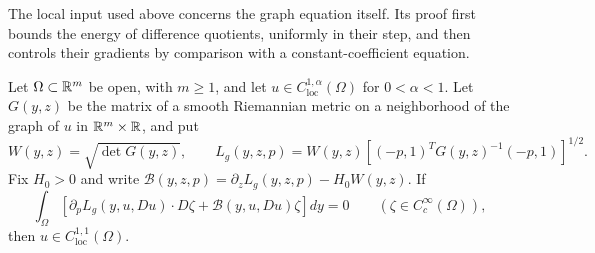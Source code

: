 The local input used above concerns the graph equation itself. Its
proof first bounds the energy of difference quotients, uniformly in
their step, and then controls their gradients by comparison with a
constant-coefficient equation.

\begin{lemma}
\label{lem:equality-graph-regularity}
Let $\Omega\subset\mathbb R^m$ be open, with $m\ge1$, and let
$u\in C^{1,\alpha}_{\mathrm{loc}}(\Omega)$ for $0<\alpha<1$.
Let $G(y,z)$ be the matrix of a smooth Riemannian metric on a
neighborhood of the graph of $u$ in $\mathbb R^m\times\mathbb R$, and put
\[
 W(y,z)=\sqrt{\det G(y,z)},\qquad
 L_g(y,z,p)=W(y,z)
 \left[(-p,1)^TG(y,z)^{-1}(-p,1)\right]^{1/2}.
\]
Fix $H_0>0$ and write
$\mathcal B(y,z,p)=\partial_zL_g(y,z,p)-H_0W(y,z)$.
If
\[
 \int_\Omega\left[
 \partial_pL_g(y,u,Du)\cdot D\zeta
 +\mathcal B(y,u,Du)\zeta\right]dy=0
 \qquad(\zeta\in C_c^\infty(\Omega)),
\]
then $u\in C^{1,1}_{\mathrm{loc}}(\Omega)$.
\end{lemma}

